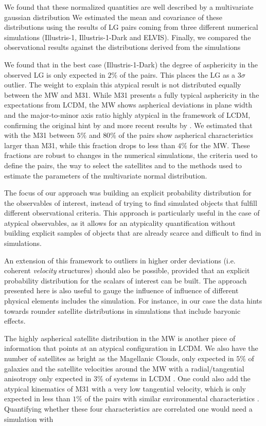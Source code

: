 \documentclass[a4paper,fleqn,usenatbib]{mnras}
\begin{document}
We found that these normalized quantities are well described by
a multivariate gaussian distribution 
We estimated the mean and covariance of these distributions using
the results of LG pairs coming from three different numerical
simulations (Illustris-1, Illustris-1-Dark and ELVIS). 
Finally, we compared the observational results against the
distributions derived from the simulations

We found that in the best case (Illustris-1-Dark) the degree of
asphericity in the observed LG is only expected in $2\%$ of the
pairs. 
This places the LG as a $3\sigma$ outlier.   
The weight to explain this atypical result is not distributed equally
between the MW and M31. 
While M31 presents a fully typical asphericity in the expectations
from LCDM, the MW shows aspherical deviations in plane width and the
major-to-minor axis ratio highly atypical in the framework of LCDM,
confirming the original hint by \cite{2005A&A...431..517K} and more
recent results by \cite{2015ApJ...815...19P}. 
We estimated that with the M31 between $5\%$ and $80\%$ of the pairs
show aspherical characteristics larger than M31, while this fraction
drops to less than $4\%$ for the MW.  
These fractions are robust to changes in the numerical simulations,
the criteria used to define the pairs, the way to select the
satellites and to the methods used to estimate the parameters of the
multivariate normal distribution.


The focus of our approach was building an explicit probability
distribution for the observables of interest, instead of trying to
find simulated objects that fulfill different observational criteria. 
This approach is particularly useful in the case of atypical
observables, as it allows for an atypicality quantification without
building explicit samples of objects that are already scarce and
difficult to find in simulations.  

An extension of this framework to outliers in higher order deviations
(i.e. coherent \emph{velocity} structures) should also be possible, 
provided that an explicit probability distribution for the scalars of
interest can be built.  
The approach presented here is also useful to gauge the influence of 
influence of different physical elements includes the simulation. 
For instance, in our case the data hints towards rounder satellite
distributions in simulations that include baryonic effects.  


The highly aspherical satellite distribution in the MW is another piece of
information that points at an atypical configuration in LCDM.
We also have the number of satellites as bright as the Magellanic
Clouds, only expected in $5\%$ of galaxies
\citep{2011ApJ...743..117B} and 
the satellite velocities around the MW with a radial/tangential
anisotropy only expected in $3\%$ of systems in LCDM
\citep{2017MNRAS.468L..41C}. 
One could also add the atypical kinematics of M31 with a very low
tangential velocity, which is only expected in less than $1\%$ of the pairs
with similar environmental characteristics \citep{ForeroRomero2013}.  
Quantifying whether these four characteristics are correlated one would
need a simulation with 
\end{document}
